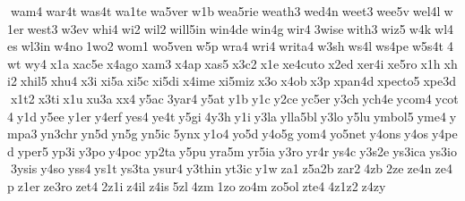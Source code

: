  wam4 war4t was4t wa1te wa5ver w1b wea5rie weath3 wed4n weet3 wee5v wel4l w1er west3 w3ev whi4 wi2 wil2 will5in win4de win4g wir4 3wise with3 wiz5 w4k wl4es wl3in w4no 1wo2 wom1 wo5ven w5p wra4 wri4 writa4 w3sh ws4l ws4pe w5s4t 4wt wy4 x1a xac5e x4ago xam3 x4ap xas5 x3c2 x1e xe4cuto x2ed xer4i xe5ro x1h xhi2 xhil5 xhu4 x3i xi5a xi5c xi5di x4ime xi5miz x3o x4ob x3p xpan4d xpecto5 xpe3d x1t2 x3ti x1u xu3a xx4 y5ac 3yar4 y5at y1b y1c y2ce yc5er y3ch ych4e ycom4 ycot4 y1d y5ee y1er y4erf yes4 ye4t y5gi 4y3h y1i y3la ylla5bl y3lo y5lu ymbol5 yme4 ympa3 yn3chr yn5d yn5g yn5ic 5ynx y1o4 yo5d y4o5g yom4 yo5net y4ons y4os y4ped yper5 yp3i y3po y4poc yp2ta y5pu yra5m yr5ia y3ro yr4r ys4c y3s2e ys3ica ys3io 3ysis y4so yss4 ys1t ys3ta ysur4 y3thin yt3ic y1w za1 z5a2b zar2 4zb 2ze ze4n ze4p z1er ze3ro zet4 2z1i z4il z4is 5zl 4zm 1zo zo4m zo5ol zte4 4z1z2 z4zy